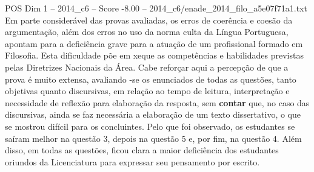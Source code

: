 \begin{textsample}{POS Dim 1 – 2014\_c6 – Score -8.00 – 2014\_c6/enade\_2014\_filo\_a5e07f71a1.txt}
Em parte considerável das provas avaliadas, os erros de coerência e coesão da argumentação, além dos erros no uso da norma culta da Língua Portuguesa, apontam para a deficiência grave para a atuação de um profissional formado em Filosofia.
Esta dificuldade põe em xeque as competências e habilidades previstas pelas Diretrizes Nacionais da Área.
Cabe reforçar aqui a percepção de que a prova é muito extensa, avaliando -se os enunciados de todas as questões, tanto objetivas quanto discursivas, em relação ao tempo de leitura, interpretação e necessidade de reflexão para elaboração da resposta, sem \textbf{contar} que, no caso das discursivas, ainda se faz necessária a elaboração de um texto dissertativo, o que se mostrou difícil para os concluintes.
Pelo que foi observado, os estudantes se saíram melhor na questão 3, depois na questão 5 e, por fim, na questão 4.
Além disso, em todas as questões, ficou clara a maior deficiência dos estudantes oriundos da Licenciatura para expressar seu pensamento por escrito.

\end{textsample}
